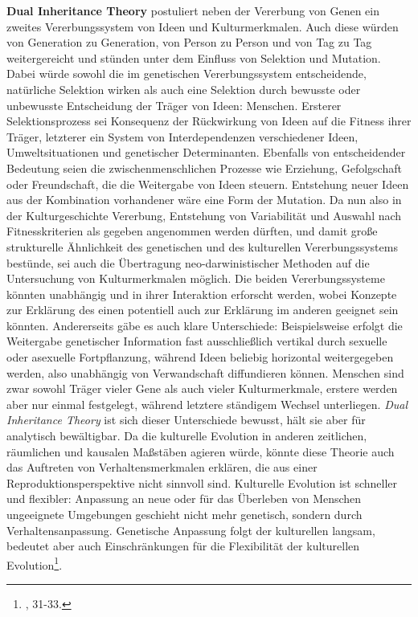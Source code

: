 \documentclass[openany,twoside,twocolumn]{book}
\let\rmarkdownfootnote\footnote%
\def\footnote{\protect\rmarkdownfootnote}
\begin{document}
\textbf{Dual Inheritance Theory} postuliert neben der Vererbung von Genen ein zweites Vererbungssystem von Ideen und Kulturmerkmalen. Auch diese würden von Generation zu Generation, von Person zu Person und von Tag zu Tag weitergereicht und stünden unter dem Einfluss von Selektion und Mutation. Dabei würde sowohl die im genetischen Vererbungssystem entscheidende, natürliche Selektion wirken als auch eine Selektion durch bewusste oder unbewusste Entscheidung der Träger von Ideen: Menschen. Ersterer Selektionsprozess sei Konsequenz der Rückwirkung von Ideen auf die Fitness ihrer Träger, letzterer ein System von Interdependenzen verschiedener Ideen, Umweltsituationen und genetischer Determinanten. Ebenfalls von entscheidender Bedeutung seien die zwischenmenschlichen Prozesse wie Erziehung, Gefolgschaft oder Freundschaft, die die Weitergabe von Ideen steuern. Entstehung neuer Ideen aus der Kombination vorhandener wäre eine Form der Mutation. Da nun also in der Kulturgeschichte Vererbung, Entstehung von Variabilität und Auswahl nach Fitnesskriterien als gegeben angenommen werden dürften, und damit große strukturelle Ähnlichkeit des genetischen und des kulturellen Vererbungssystems bestünde, sei auch die Übertragung neo-darwinistischer Methoden auf die Untersuchung von Kulturmerkmalen möglich. Die beiden Vererbungssysteme könnten unabhängig und in ihrer Interaktion erforscht werden, wobei Konzepte zur Erklärung des einen potentiell auch zur Erklärung im anderen geeignet sein könnten. Andererseits gäbe es auch klare Unterschiede: Beispielsweise erfolgt die Weitergabe genetischer Information fast ausschließlich vertikal durch sexuelle oder asexuelle Fortpflanzung, während Ideen beliebig horizontal weitergegeben werden, also unabhängig von Verwandschaft diffundieren können. Menschen sind zwar sowohl Träger vieler Gene als auch vieler Kulturmerkmale, erstere werden aber nur einmal festgelegt, während letztere ständigem Wechsel unterliegen. \emph{Dual Inheritance Theory} ist sich dieser Unterschiede bewusst, hält sie aber für analytisch bewältigbar. Da die kulturelle Evolution in anderen zeitlichen, räumlichen und kausalen Maßstäben agieren würde, könnte diese Theorie auch das Auftreten von Verhaltensmerkmalen erklären, die aus einer Reproduktionsperspektive nicht sinnvoll sind. Kulturelle Evolution ist schneller und flexibler: Anpassung an neue oder für das Überleben von Menschen ungeeignete Umgebungen geschieht nicht mehr genetisch, sondern durch Verhaltensanpassung. Genetische Anpassung folgt der kulturellen langsam, bedeutet aber auch Einschränkungen für die Flexibilität der kulturellen Evolution\footnote{\textcite{SmithThreestylesevolutionary2000}, 31-33.}.
\end{document}
